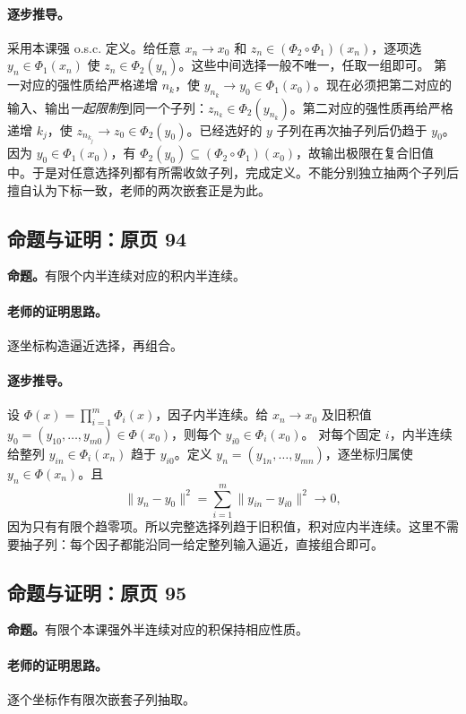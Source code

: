 \documentclass[11pt,a4paper]{article}
\theoremstyle{definition}\newtheorem{definition}{定义}\newtheorem{example}{例}
\begin{document}
\paragraph{逐步推导。}
采用本课强 o.s.c. 定义。给任意 $x_n\to x_0$ 和 $z_n\in(\Phi_2\circ\Phi_1)(x_n)$，逐项选 $y_n\in\Phi_1(x_n)$ 使 $z_n\in\Phi_2(y_n)$。这些中间选择一般不唯一，任取一组即可。
第一对应的强性质给严格递增 $n_k$，使 $y_{n_k}\to y_0\in\Phi_1(x_0)$。现在必须把第二对应的输入、输出\emph{一起限制}到同一个子列：$z_{n_k}\in\Phi_2(y_{n_k})$。第二对应的强性质再给严格递增 $k_j$，使 $z_{n_{k_j}}\to z_0\in\Phi_2(y_0)$。已经选好的 $y$ 子列在再次抽子列后仍趋于 $y_0$。
因为 $y_0\in\Phi_1(x_0)$，有 $\Phi_2(y_0)\subseteq(\Phi_2\circ\Phi_1)(x_0)$，故输出极限在复合旧值中。于是对任意选择列都有所需收敛子列，完成定义。不能分别独立抽两个子列后擅自认为下标一致，老师的两次嵌套正是为此。


\subsection{命题与证明：原页 94}

\textbf{命题。}有限个内半连续对应的积内半连续。

\paragraph{老师的证明思路。}逐坐标构造逼近选择，再组合。

\paragraph{逐步推导。}
设 $\Phi(x)=\prod_{i=1}^m\Phi_i(x)$，因子内半连续。给 $x_n\to x_0$ 及旧积值 $y_0=(y_{10},\ldots,y_{m0})\in\Phi(x_0)$，则每个 $y_{i0}\in\Phi_i(x_0)$。
对每个固定 $i$，内半连续给整列 $y_{in}\in\Phi_i(x_n)$ 趋于 $y_{i0}$。定义 $y_n=(y_{1n},\ldots,y_{mn})$，逐坐标归属使 $y_n\in\Phi(x_n)$。且
\[\|y_n-y_0\|^2=\sum_{i=1}^m\|y_{in}-y_{i0}\|^2\to0,\]
因为只有有限个趋零项。所以完整选择列趋于旧积值，积对应内半连续。这里不需要抽子列：每个因子都能沿同一给定整列输入逼近，直接组合即可。


\subsection{命题与证明：原页 95}

\textbf{命题。}有限个本课强外半连续对应的积保持相应性质。

\paragraph{老师的证明思路。}逐个坐标作有限次嵌套子列抽取。
\end{document}
